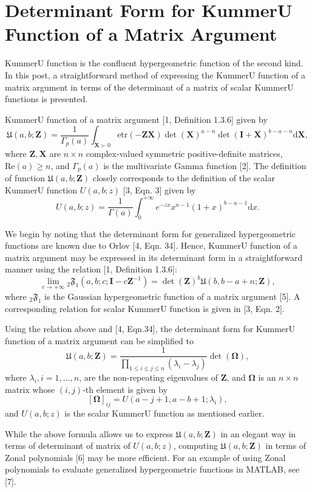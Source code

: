 \section{Determinant Form for KummerU Function of a Matrix Argument}

KummerU function is the confluent hypergeometric function of the second kind. In this post, a straightforward method of expressing the KummerU function of a matrix argument in terms of the determinant of a matrix of scalar KummerU functions is presented.

KummerU function of a matrix argument [1, Definition 1.3.6] given by $$\mathfrak{U}(a,b;\boldsymbol{Z}) = \frac{1}{\Gamma_p(a)}\int_{\boldsymbol{X} \succ 0} \text{etr}(-\boldsymbol{Z}\boldsymbol{X}) \det(\boldsymbol{X})^{a-n} \det(\boldsymbol{I} + \boldsymbol{X})^{b-a-n} \text{d}\boldsymbol{X},$$ where $\boldsymbol{Z}, \boldsymbol{X}$ are $n\times n$ complex-valued symmetric positive-definite matrices, $\text{Re}(a) \geq n$, and $\Gamma_p(a)$ is the multivariate Gamma function [2]. The definition of function $\mathfrak{U}(a,b;\boldsymbol{Z})$ closely corresponds to the definition of the scalar KummerU function $U(a,b;z)$ [3, Eqn. 3] given by $$U(a,b;z) = \frac{1}{\Gamma(a)} \int_{0}^{+\infty} e^{-zx} x^{a-1} (1+x)^{b-a-1} \text{d}x.$$

We begin by noting that the determinant form for generalized hypergeometric functions are known due to Orlov [4, Eqn. 34]. Hence, KummerU function of a matrix argument may be expressed in its determinant form in a straightforward manner using the relation [1, Definition 1.3.6]: $$\lim_{c\to +\infty} {}_2\mathfrak{F}_{1}(a,b;c;\boldsymbol{I}-c\boldsymbol{Z}^{-1}) = \det(\boldsymbol{Z})^b \mathfrak{U}(b,b-a+n; \boldsymbol{Z}),$$ where ${}_2\mathfrak{F}_{1}$ is the Gaussian hypergeometric function of a matrix argument [5]. A corresponding relation for scalar KummerU function is given in [3, Eqn. 2].

Using the relation above and [4, Eqn.34], the determinant form for KummerU function of a matrix argument can be simplified to $$\mathfrak{U}(a,b;\boldsymbol{Z}) = \frac{1}{\prod_{1\leq i \leq j \leq n}(\lambda_i-\lambda_j)}\det(\boldsymbol{\Omega}),$$ where $\lambda_i,i=1,\dots,n$, are the non-repeating eigenvalues of $\boldsymbol{Z}$, and $\boldsymbol{\Omega}$ is an $n\times n$ matrix whose $(i,j)$-th element is given by $$[\boldsymbol{\Omega}]_{ij} = U(a-j+1,a-b+1;\lambda_i),$$ and $U(a,b;z)$ is the scalar KummerU function as mentioned earlier.

While the above formula allows us to express $\mathfrak{U}(a,b;\boldsymbol{Z})$ in an elegant way in terms of determinant of matrix of $U(a,b;z)$, computing $\mathfrak{U}(a,b;\boldsymbol{Z})$ in terms of Zonal polynomials [6] may be more efficient. For an example of using Zonal polynomials to evaluate generalized hypergeometric functions in MATLAB, see [7]. 


